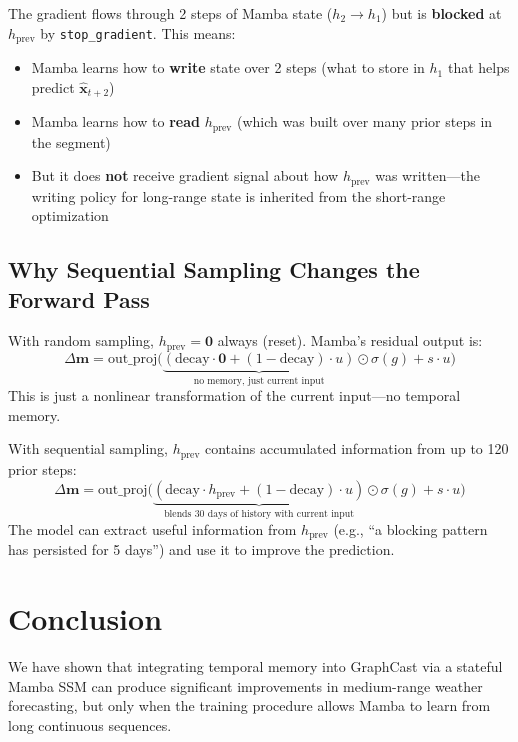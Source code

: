 \documentclass[11pt,a4paper]{article}
\begin{document}
The gradient flows through 2 steps of Mamba state ($h_2 \to h_1$) but is \textbf{blocked} at $h_\text{prev}$ by \texttt{stop\_gradient}. This means:
\begin{itemize}[nosep]
  \item Mamba learns how to \textbf{write} state over 2 steps (what to store in $h_1$ that helps predict $\hat{\mathbf{x}}_{t+2}$)
  \item Mamba learns how to \textbf{read} $h_\text{prev}$ (which was built over many prior steps in the segment)
  \item But it does \textbf{not} receive gradient signal about how $h_\text{prev}$ was written---the writing policy for long-range state is inherited from the short-range optimization
\end{itemize}

\subsection{Why Sequential Sampling Changes the Forward Pass}

With random sampling, $h_\text{prev} = \mathbf{0}$ always (reset). Mamba's residual output is:
\[
\Delta\mathbf{m} = \text{out\_proj}\Big(\underbrace{(\text{decay} \cdot \mathbf{0} + (1-\text{decay}) \cdot u)}_{\text{no memory, just current input}} \odot \sigma(g) + s \cdot u\Big)
\]
This is just a nonlinear transformation of the current input---no temporal memory.

With sequential sampling, $h_\text{prev}$ contains accumulated information from up to 120 prior steps:
\[
\Delta\mathbf{m} = \text{out\_proj}\Big(\underbrace{(\text{decay} \cdot h_\text{prev} + (1-\text{decay}) \cdot u)}_{\text{blends 30 days of history with current input}} \odot \sigma(g) + s \cdot u\Big)
\]
The model can extract useful information from $h_\text{prev}$ (e.g., ``a blocking pattern has persisted for 5 days'') and use it to improve the prediction.

\section{Conclusion}

We have shown that integrating temporal memory into GraphCast via a stateful Mamba SSM can produce significant improvements in medium-range weather forecasting, but only when the training procedure allows Mamba to learn from long continuous sequences.
\end{document}
